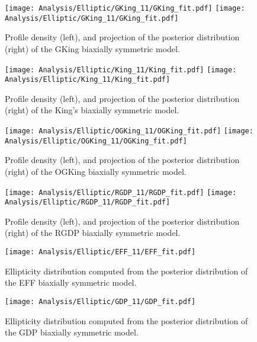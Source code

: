 \begin {figure}
 \centering
 \texttt{[image: Analysis/Elliptic/GKing\_11/GKing\_fit.pdf]}
 \texttt{[image: Analysis/Elliptic/GKing\_11/GKing\_fit.pdf]}
  \caption{Profile density (left), and projection of the posterior distribution (right) of the GKing biaxially symmetric model.}
\label{fig:GKingEll}
\end {figure}

\begin {figure}
 \centering
 \texttt{[image: Analysis/Elliptic/King\_11/King\_fit.pdf]}
 \texttt{[image: Analysis/Elliptic/King\_11/King\_fit.pdf]}
  \caption{Profile density (left), and projection of the posterior distribution (right) of the King's biaxially symmetric model.}
\label{fig:KingEll}
\end {figure}


\begin {figure}
 \centering
 \texttt{[image: Analysis/Elliptic/OGKing\_11/OGKing\_fit.pdf]}
 \texttt{[image: Analysis/Elliptic/OGKing\_11/OGKing\_fit.pdf]}
  \caption{Profile density (left), and projection of the posterior distribution (right) of the OGKing biaxially symmetric model.}
\label{fig:OGKingEll}
\end {figure}

\begin {figure}
 \centering
 \texttt{[image: Analysis/Elliptic/RGDP\_11/RGDP\_fit.pdf]}
 \texttt{[image: Analysis/Elliptic/RGDP\_11/RGDP\_fit.pdf]}
  \caption{Profile density (left), and projection of the posterior distribution (right) of the RGDP biaxially symmetric model.}
\label{fig:RGDPEll}
\end {figure}


\clearpage
\begin {figure}
 \centering
 \texttt{[image: Analysis/Elliptic/EFF\_11/EFF\_fit.pdf]}
  \caption{Ellipticity distribution computed from the posterior distribution of the EFF biaxially symmetric model.}
\label{fig:EFFEllepsilon}
\end {figure}

\begin {figure}
 \centering
 \texttt{[image: Analysis/Elliptic/GDP\_11/GDP\_fit.pdf]}
  \caption{Ellipticity distribution computed from the posterior distribution of the GDP biaxially symmetric model.}
\label{fig:GDPEllepsilon}
\end {figure}

